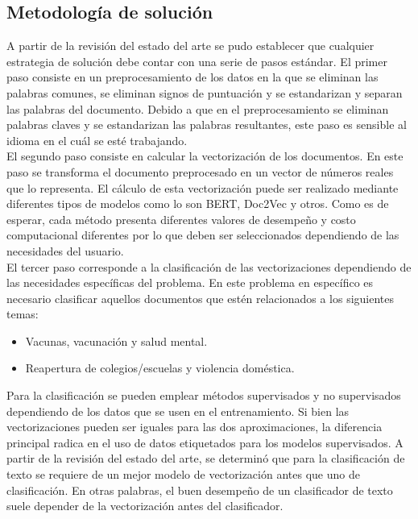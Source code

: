 \subsection{Metodología de solución}
A partir de la revisión del estado del arte se pudo establecer que cualquier estrategia de solución debe contar con una serie de pasos estándar. El primer paso consiste en un preprocesamiento de los datos en la que se eliminan las palabras comunes, se eliminan signos de puntuación y se estandarizan y separan las palabras del documento. Debido a que en el preprocesamiento se eliminan palabras claves y se estandarizan las palabras resultantes, este paso es sensible al idioma en el cuál se esté trabajando. \\ 

El segundo paso consiste en calcular la vectorización de los documentos. En este paso se transforma el documento preprocesado en un vector de números reales que lo representa. El cálculo de esta vectorización puede ser realizado mediante diferentes tipos de modelos como lo son BERT, Doc2Vec y otros. Como es de esperar, cada método presenta diferentes valores de desempeño y costo computacional diferentes por lo que deben ser seleccionados dependiendo de las necesidades del usuario. \\

El tercer paso corresponde a la clasificación de las vectorizaciones dependiendo de las necesidades específicas del problema. En este problema en específico es necesario clasificar aquellos documentos que estén relacionados a los siguientes temas:

\begin{itemize}
    \item Vacunas, vacunación y salud mental.
    \item Reapertura de colegios/escuelas y violencia doméstica.
\end{itemize}

Para la clasificación se pueden emplear métodos supervisados y no supervisados dependiendo de los datos que se usen en el entrenamiento. Si bien las vectorizaciones pueden ser iguales para las dos aproximaciones, la diferencia principal radica en el uso de datos etiquetados para los modelos supervisados. A partir de la revisión del estado del arte, se determinó que para la clasificación de texto se  requiere de un mejor modelo de vectorización antes que uno de clasificación. En otras palabras, el buen desempeño de un clasificador de texto suele depender de la vectorización antes del clasificador.

